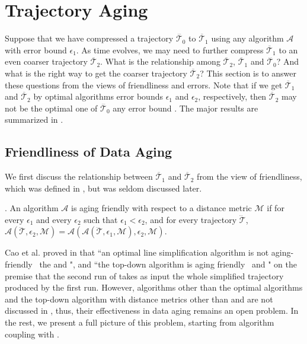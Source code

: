 
{\section{Trajectory Aging}}
\label{sec-aging}

Suppose that we have compressed a trajectory $\dddot{\mathcal{T}_0}$ to $\overline{\mathcal{T}}_1$ using any \lsa algorithm $\mathcal{A}$ with error bound $\epsilon_1$. As time evolves, we may need to further compress $\overline{\mathcal{T}}_1$ to an even coarser trajectory $\overline{\mathcal{T}}_2$.
What is the relationship among $\overline{\mathcal{T}}_2$, $\overline{\mathcal{T}}_1$ and $\dddot{\mathcal{T}_0}$? And what is the right way to get the coarser trajectory $\overline{\mathcal{T}}_2$?
%
This section is to answer these questions from the views of friendliness \cite{Cao:Spatio} and errors.
Note that if we get $\overline{\mathcal{T}}_1$ and $\overline{\mathcal{T}}_2$ by optimal algorithms \wrt error bounds $\epsilon_1$ and $\epsilon_2$, respectively, then $\overline{\mathcal{T}}_2$ may not be the optimal one of $\dddot{\mathcal{T}_0}$ \wrt any error bound \cite{Cao:Spatio}. The major results are summarized in .


\subsection{Friendliness of Data Aging}
We first discuss the relationship between $\overline{\mathcal{T}}_1$ and $\overline{\mathcal{T}}_2$ from the view of friendliness, which was defined in \cite{Cao:Spatio}, but was seldom discussed later.
	
. {An \lsa algorithm $\mathcal{A}$ is aging friendly with respect to a distance metric $\mathcal{M}$ if for every $\epsilon_1$ and every $\epsilon_2$ such that $\epsilon_1 < \epsilon_2$, and for every trajectory $\dddot{\mathcal{T}}$, $\mathcal{A}(\dddot{\mathcal{T}}, \epsilon_2, \mathcal{M})= \mathcal{A}(\mathcal{A}(\dddot{\mathcal{T}}, \epsilon_1, \mathcal{M}), \epsilon_2, \mathcal{M})$.}

Cao et al. proved in \cite{Cao:Spatio} that ``an optimal line simplification algorithm is not aging-friendly \wrt~the \ped and \sed", and ``the top-down algorithm \dpa is aging friendly \wrt~\ped and \sed" on the premise that the second run of \dpa takes as input the whole simplified trajectory produced by the first run.
However, algorithms other than the optimal algorithms and the top-down algorithm \dpa with distance metrics other than \ped and \sed are not discussed in \cite{Cao:Spatio}, thus, their effectiveness in data aging remains an open problem.
In the rest, we  present a full picture of this problem, starting from algorithm \opt coupling with \dad.

